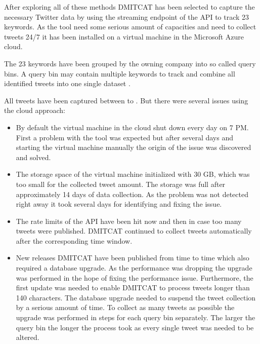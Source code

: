 After exploring all of these methods \ac{DMITCAT} has been selected to capture the necessary Twitter data by using the streaming endpoint of the \ac{API} to track 23 keywords.
As the tool need some serious amount of capacities and need to collect tweets 24/7 it has been installed on a virtual machine in the Microsoft Azure cloud.

The 23 keywords have been grouped by the owning company into so called query bins.
A query bin may contain multiple keywords to track and combine all identified tweets into one single dataset \citep{Borra2014}.

All tweets have been captured between  to .
But there were several issues using the cloud approach:

\begin{itemize}

  \item By default the virtual machine in the cloud shut down every day on 7 PM.
    First a problem with the tool was expected but after several days and starting the virtual machine manually the origin of the issue was discovered and solved.

  \item The storage space of the virtual machine initialized with 30 \ac{GB}, which was too small for the collected tweet amount.
    The storage was full after approximately 14 days of data collection.
    As the problem was not detected right away it took several days for identifying and fixing the issue.

  \item The rate limits of the \ac{API} have been hit now and then in case too many tweets were published.
  \ac{DMITCAT} continued to collect tweets automatically after the corresponding time window.

  \item New releases \ac{DMITCAT} have been published from time to time which also required a database upgrade.
    As the performance was dropping the upgrade was performed in the hope of fixing the performance issue.
    Furthermore, the first update was needed to enable \ac{DMITCAT} to process tweets longer than 140 characters.
    The database upgrade needed to suspend the tweet collection by a serious amount of time.
    To collect as many tweets as possible the upgrade was performed in steps for each query bin separately.
    The larger the query bin the longer the process took as every single tweet was needed to be altered.

\end{itemize}

